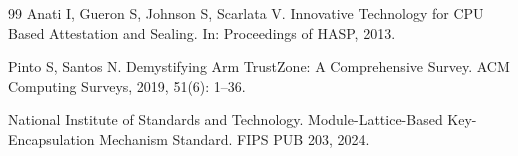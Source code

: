\begin{thebibliography}{99}
 Anati I, Gueron S, Johnson S, Scarlata V. Innovative Technology for CPU Based Attestation and Sealing. In: Proceedings of HASP, 2013.

 Pinto S, Santos N. Demystifying Arm TrustZone: A Comprehensive Survey. ACM Computing Surveys, 2019, 51(6): 1--36.

 National Institute of Standards and Technology. Module-Lattice-Based Key-Encapsulation Mechanism Standard. FIPS PUB 203, 2024.

\end{thebibliography}

